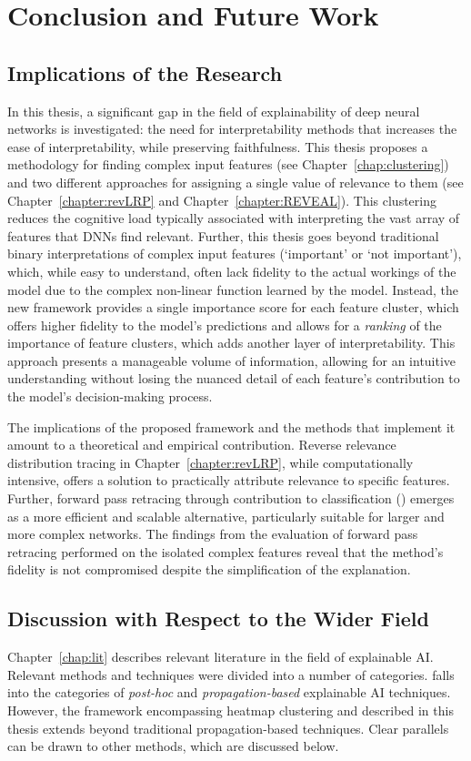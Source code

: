 \chapter{Conclusion and Future Work}
\label{chapter:conclusion}
\section{Implications of the Research}
In this thesis, a significant gap in the field of explainability of deep neural networks is investigated: the need for interpretability methods that increases the ease of interpretability, while preserving faithfulness. This thesis proposes a methodology for finding complex input features (see Chapter~\ref{chap:clustering}) and two different approaches for assigning a single value of relevance to them (see Chapter~\ref{chapter:revLRP} and Chapter~\ref{chapter:REVEAL}). This clustering reduces the cognitive load typically associated with interpreting the vast array of features that DNNs find relevant. Further, this thesis goes beyond traditional binary interpretations of complex input features (`important' or `not important'), which, while easy to understand, often lack fidelity to the actual workings of the model due to the complex non-linear function learned by the model. Instead, the new framework provides a single importance score for each feature cluster, which offers higher fidelity to the model's predictions and allows for a \emph{ranking} of the importance of feature clusters, which adds another layer of interpretability. This approach presents a manageable volume of information, allowing for an intuitive understanding without losing the nuanced detail of each feature's contribution to the model's decision-making process.

The implications of the proposed framework and the methods that implement it amount to a theoretical and empirical contribution. Reverse relevance distribution tracing in Chapter~\ref{chapter:revLRP}, while computationally intensive, offers a solution to practically attribute relevance to specific features. Further, forward pass retracing through contribution to classification (\CTC\/) emerges as a more efficient and scalable alternative, particularly suitable for larger and more complex networks. The findings from the evaluation of forward pass retracing performed on the isolated complex features reveal that the method's fidelity is not compromised despite the simplification of the explanation. 

\section{Discussion with Respect to the Wider Field}
Chapter~\ref{chap:lit} describes relevant literature in the field of explainable AI. Relevant methods and techniques were divided into a number of categories. \CTC\/ falls into the categories of \textit{post-hoc} and \textit{propagation-based} explainable AI techniques.  However, the framework encompassing heatmap clustering and \CTC\/ described in this thesis extends beyond traditional propagation-based techniques. Clear parallels can be drawn to other methods, which are discussed below.

